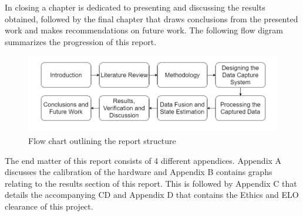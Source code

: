 In closing a chapter is dedicated to presenting and discussing the results obtained, followed by the final chapter that draws conclusions from the presented work and makes recommendations on future work. The following flow digram summarizes the progression of this report.

\begin{figure}[!ht] 
\captionsetup{width=0.8\linewidth, font=small}  
\includegraphics[width=\linewidth]{figures/introflow.png}
\caption{Flow chart outlining the report structure}
\label{fig:introflow}
\end{figure}

The end matter of this report consists of 4 different appendices. Appendix A discusses the calibration of the hardware and Appendix B contains graphs relating to the results section of this report. This is followed by Appendix C that details the accompanying CD and Appendix D that contains the Ethics and ELO clearance of this project.